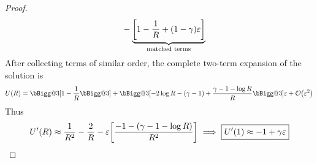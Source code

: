 \documentclass{article} %
\makeatletter
\theoremstyle{plain}
\newcommand{\BIGG}{\bBigg@{3}}
\newcommand{\E}{\varepsilon}
\numberwithin{equation}{section} %
\numberwithin{figure}{section} %
\numberwithin{table}{section} %
\makeatother
\begin{document}
\begin{proof}
\begin{align*}
        &\qquad - \underbrace{\qty[1 - \frac{1}{R} + \qty(1 - \gamma)\E]}_{\text{matched terms}}
    \end{align*}
    After collecting terms of similar order, the complete two-term expansion of the solution is
    \begin{align*}
        U(R) = \BIGG[1 - \frac{1}{R}\BIGG] + \BIGG[-2\log R - (\gamma - 1) + \frac{\gamma - 1 - \log R}{R}\BIGG]\E + \order{\E^2}
    \end{align*}
    Thus
    \begin{align*}
        U'(R) \approx \frac{1}{R^2} - \frac{2}{R} - \E\qty[\frac{-1 - \qty(\gamma - 1 - \log R)}{R^2}] \implies \boxed{U'(1) \approx -1 + \gamma\E}
    \end{align*}
\end{proof}
    
\end{document}
